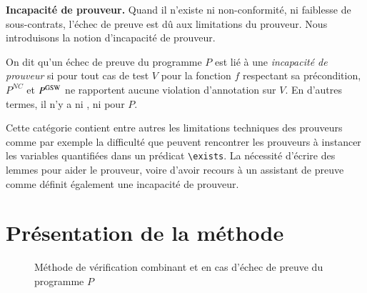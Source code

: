 \textbf{Incapacité de prouveur.}
Quand il n'existe ni non-conformité, ni faiblesse de sous-contrats, l'échec de
preuve est dû aux limitations du prouveur.
Nous introduisons la notion d'incapacité de prouveur.

\begin{definition}
\label{def:prov-incap}
On dit qu'un échec de preuve du programme $P$ est lié à une
\emph{incapacité de prouveur} si pour tout cas de test $V$ pour la fonction $f$
respectant sa précondition, $P^{NC}$ et $P^{\mathrm{GSW}}$ ne rapportent aucune violation
d'annotation sur $V$.
En d'autres termes, il n'y a ni \NCCE, ni \GSWCE pour $P$.
\end{definition}

Cette catégorie contient entre autres les limitations techniques des prouveurs
comme par exemple la difficulté que peuvent rencontrer les prouveurs à
instancer les variables quantifiées dans un prédicat \lstinline'\exists'.
La nécessité d'écrire des lemmes pour aider le prouveur, voire d'avoir recours
à un assistant de preuve comme \coq définit également une incapacité de
prouveur.


\section{Présentation de la méthode}
\label{sec:method-presentation}


\begin{figure*}[bt]\centering
{}
\vspace{-2mm}
\caption{Méthode de vérification combinant \NCD et \SWD en cas d'échec de
  preuve du programme $P$}
\label{fig:method-short}
\end{figure*}

